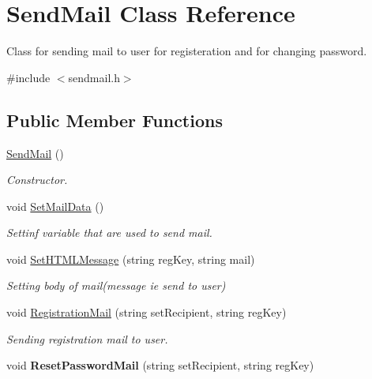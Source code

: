 \hypertarget{classSendMail}{\section{Send\-Mail Class Reference}
\label{classSendMail}
}


Class for sending mail to user for registeration and for changing password.  




{\ttfamily \#include $<$sendmail.\-h$>$}

\subsection*{Public Member Functions}
\begin{DoxyCompactItemize}
\item 
\hypertarget{classSendMail_ae0d11ddeda1ae7ae1cc3b8f11678ed92}{\hyperlink{classSendMail_ae0d11ddeda1ae7ae1cc3b8f11678ed92}{Send\-Mail} ()}\label{classSendMail_ae0d11ddeda1ae7ae1cc3b8f11678ed92}

\begin{DoxyCompactList}\small\item\em Constructor. \end{DoxyCompactList}\item 
\hypertarget{classSendMail_a25ba5afabc97cf3dab525f2eb1e67e0e}{void \hyperlink{classSendMail_a25ba5afabc97cf3dab525f2eb1e67e0e}{Set\-Mail\-Data} ()}\label{classSendMail_a25ba5afabc97cf3dab525f2eb1e67e0e}

\begin{DoxyCompactList}\small\item\em Settinf variable that are used to send mail. \end{DoxyCompactList}\item 
void \hyperlink{classSendMail_a89c5a5bace5c21014b8184db5707b986}{Set\-H\-T\-M\-L\-Message} (string reg\-Key, string mail)
\begin{DoxyCompactList}\small\item\em Setting body of mail(message ie send to user) \end{DoxyCompactList}\item 
void \hyperlink{classSendMail_a4c9983852dbcd1eb07170582761ed559}{Registration\-Mail} (string set\-Recipient, string reg\-Key)
\begin{DoxyCompactList}\small\item\em Sending registration mail to user. \end{DoxyCompactList}\item 
\hypertarget{classSendMail_a56180b5a27efd4d43514f91008b280ef}{void {\bfseries Reset\-Password\-Mail} (string set\-Recipient, string reg\-Key)}\label{classSendMail_a56180b5a27efd4d43514f91008b280ef}


\end{DoxyCompactItemize}
